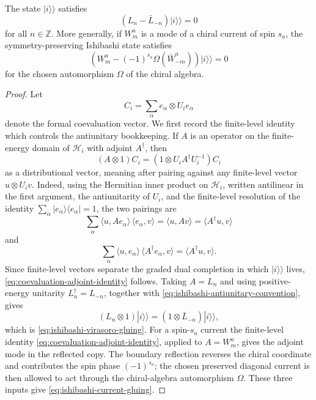 \begin{proposition}
\label{prop:ishibashi-gluing}
The state \(|i\rangle\!\rangle\) satisfies
\begin{equation}
  (L_n-\bar L_{-n})|i\rangle\!\rangle=0
  \label{eq:ishibashi-virasoro-gluing}
\end{equation}
for all \(n\in\mathbb Z\).  More generally, if \(W^a_m\) is a mode of a
chiral current of spin \(s_a\), the symmetry-preserving Ishibashi state
satisfies
\begin{equation}
  \left(W^a_m-(-1)^{s_a}\Omega(\bar W^a_{-m})\right)|i\rangle\!\rangle=0
  \label{eq:ishibashi-current-gluing}
\end{equation}
for the chosen automorphism \(\Omega\) of the chiral algebra.
\end{proposition}

\begin{proof}
Let
\[
  C_i=\sum_\alpha e_\alpha\otimes U_i e_\alpha
\]
denote the formal coevaluation vector.  We first record the finite-level
identity which controls the antiunitary bookkeeping.  If \(A\) is an operator
on the finite-energy domain of \(\mathcal H_i\) with adjoint \(A^\dagger\),
then
\begin{equation}
  (A\otimes 1)C_i=(1\otimes U_i A^\dagger U_i^{-1})C_i
  \label{eq:coevaluation-adjoint-identity}
\end{equation}
as a distributional vector, meaning after pairing against any
finite-level vector \(u\otimes U_iv\).  Indeed, using the Hermitian inner
product on \(\mathcal H_i\), written antilinear in the first argument, the
antiunitarity of \(U_i\), and the finite-level resolution of the identity
\(\sum_\alpha |e_\alpha\rangle\langle e_\alpha|=1\), the two pairings are
\[
  \sum_\alpha
  \langle u,Ae_\alpha\rangle\,\langle e_\alpha,v\rangle
  =
  \langle u,Av\rangle
  =
  \langle A^\dagger u,v\rangle
\]
and
\[
  \sum_\alpha
  \langle u,e_\alpha\rangle\,\langle A^\dagger e_\alpha,v\rangle
  =
  \langle A^\dagger u,v\rangle .
\]
Since finite-level vectors separate the graded dual completion in which
\(|i\rangle\!\rangle\) lives, \eqref{eq:coevaluation-adjoint-identity}
follows.  Taking \(A=L_n\) and using positive-energy unitarity
\(L_n^\dagger=L_{-n}\), together with
\eqref{eq:ishibashi-antiunitary-convention}, gives
\[
  (L_n\otimes 1)|i\rangle\!\rangle
  =
  (1\otimes \bar L_{-n})|i\rangle\!\rangle ,
\]
which is \eqref{eq:ishibashi-virasoro-gluing}.  For a spin-\(s_a\) current the
finite-level identity \eqref{eq:coevaluation-adjoint-identity}, applied to
\(A=W^a_m\), gives the adjoint mode in the reflected copy.  The boundary
reflection reverses the chiral coordinate and contributes the spin phase
\((-1)^{s_a}\); the chosen preserved diagonal current is then allowed to act
through the chiral-algebra automorphism \(\Omega\).  These three inputs give
\eqref{eq:ishibashi-current-gluing}.
\end{proof}

